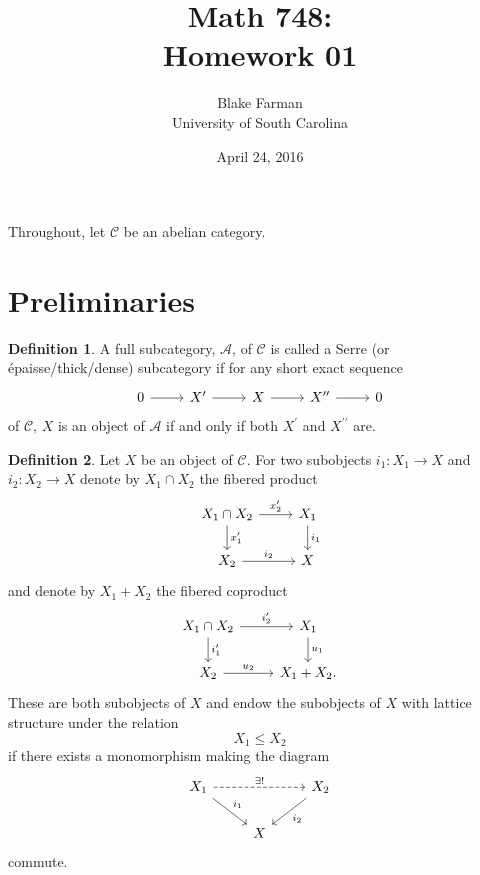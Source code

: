 \documentclass[10pt]{amsart}
\author{Blake Farman\\University of South Carolina}
\title{Math 748:\\Homework 01}
\date{April 24, 2016}
\begin{document}

\providecommand{\p}{\mathfrak{p}}
\providecommand{\m}{\mathfrak{m}}
\providecommand{\Deck}[1]{\operatorname{Deck}\left(#1\right)}
\newtheorem{thm}{Theorem}
\newtheorem{ex}{}
\newtheorem{lem}{Lemma}
\newtheorem{cor}{Corollary}
\newtheorem{prop}{Proposition}
\theoremstyle{definition}
\newtheorem{defn}{Definition}
\newtheorem{rmk}{Remark}

\newcommand{\A}{\mathscr{A}}
\renewcommand{\C}{\mathscr{C}}

Throughout, let $\C$ be an abelian category.

\section{Preliminaries}
\begin{defn}
  A full subcategory, $\A$, of $\C$ is called a Serre (or \'{e}paisse/thick/dense) subcategory if for any short exact sequence
  $$\begin{tikzcd}
    0 \arrow{r} & X^\prime \arrow{r} & X \arrow{r} & X^{\prime\prime} \arrow{r} & 0
  \end{tikzcd}$$
  of $\C$, $X$ is an object of $\A$ if and only if both $X^\prime$ and $X^{\prime\prime}$ are.
\end{defn}

\begin{defn}
  Let $X$ be an object of $\C$.
  For two subobjects $i_1 \colon X_1 \rightarrow X$ and $i_2 \colon X_2 \rightarrow X$ denote by $X_1 \cap X_2$ the fibered product
  $$\begin{tikzcd}
    X_1 \cap X_2 \arrow{d}{x_1^\prime}\arrow{r}{x_2^\prime} & X_1\arrow{d}{i_1}\\
    X_2 \arrow{r}{i_2} & X
  \end{tikzcd}$$
  and denote by $X_1 + X_2$ the fibered coproduct 
  $$\begin{tikzcd}
    X_1 \cap X_2 \arrow{r}{i_2^\prime} \arrow{d}{i_1^\prime} & X_1\arrow{d}{u_1}\\
    X_2 \arrow{r}{u_2} & X_1 + X_2.
  \end{tikzcd}$$
  These are both subobjects of $X$ and endow the subobjects of $X$ with lattice structure under the relation
  $$X_1 \leq X_2$$
  if there exists a monomorphism making the diagram
  $$\begin{tikzcd}
    X_1\arrow{rd}{i_1}\arrow[dashed]{rr}{\exists !} & & X_2 \arrow{ld}{i_2}\\
    & X &
  \end{tikzcd}$$
  commute.
\end{defn}
\end{document}
